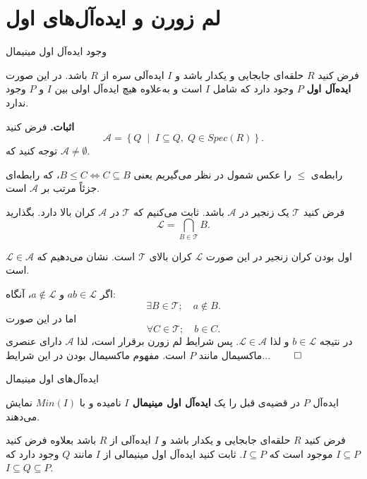 \section{لم زورن و ایده‌آل‌های اول}

\begin{frame}[t]{وجود ایده‌آل اول مینیمال}
    \begin{theorem}
        فرض کنید $R$ حلقه‌ای جابجایی و یکدار باشد و $I$ ایده‌آلی سره از $R$ باشد. در این صورت \textbf{ایده‌آل اول} $P$ وجود دارد که شامل $I$ است و به‌علاوه هیچ ایده‌آل اولی بین $I$ و $P$ وجود ندارد.
    \end{theorem}
    \textbf{اثبات.}
    فرض کنید
    \[
        \mathcal{A} = \left\{ Q \;\middle|\; I \subseteq Q,\; Q \in Spec(R) \right\}.
    \]
    توجه کنید که $\mathcal{A} \ne \emptyset$.

    رابطه‌ی $\leq$ را عکس شمول در نظر می‌گیریم یعنی $B \leq C \Leftrightarrow C \subseteq B$، که رابطه‌ای جزئاً مرتب بر $\mathcal{A}$ است.

    فرض کنید $\mathcal{T}$ یک زنجیر در $\mathcal{A}$ باشد. ثابت می‌کنیم که $\mathcal{T}$ در $\mathcal{A}$ کران بالا دارد. بگذارید
    \[
        \mathcal{L} = \bigcap_{B \in \mathcal{T}} B.
    \]

\end{frame}

\begin{frame}[t]{اول بودن کران زنجیر}
    در این صورت $\mathcal{L} $ کران بالای $\mathcal{T}$ است. نشان می‌دهیم که $\mathcal{L}  \in \mathcal{A}$ است.

    اگر $ab \in \mathcal{L} $ و $a \notin \mathcal{L} $، آنگاه:
    \[
        \exists B \in \mathcal{T}; \quad  a \notin B.
    \]
    اما در این صورت
    \[
        \forall C \in \mathcal{T}; \quad b \in C.
    \]
    در نتیجه \(b \in \mathcal{L}\) و لذا \(\mathcal{L} \in \mathcal{A}\).
    پس شرایط لم زورن برقرار است، لذا \(\mathcal{A}\) دارای عنصری ماکسیمال مانند \(P\) است.
    مفهوم ماکسیمال بودن در این شرایط...
    \hfill
    \(\qed\)
\end{frame}



\begin{frame}[t]{ایده‌آل‌های اول مینیمال}
    \begin{definition}
        ایده‌آل $P$ در قضیه‌ی قبل را یک \textbf{ایده‌آل اول مینیمال $I$} نامیده و با $Min(I)$ نمایش می‌دهند.
    \end{definition}
    \begin{exercise}
        فرض کنید $R$ حلقه‌ای جابجایی و یکدار باشد و $I$ ایده‌آلی از $R$ باشد    بعلاوه فرض کنید  $I \subseteq P$   موجود است که $I \subseteq P$. ثابت کنید ایده‌آل اول مینیمالی از \(I\) مانند \(Q\) وجود دارد که  $I \subseteq Q \subseteq P$.

    \end{exercise}

\end{frame}

